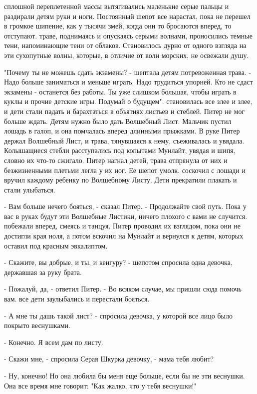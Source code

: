 сплошной переплетенной массы вытягивались маленькие серые пальцы и 
раздирали детям руки и ноги. Постоянный шепот все нарастал, пока не 
перешел в громкое шипение, как у тысячи змей, когда они то бросаются 
вперед, то отступают.
 траве, поднимаясь и опускаясь серыми волнами, проносились 
темные тени, напоминающие тени от облаков. Становилось дурно от одного 
взгляда на эти сухопутные волны, которые, в отличие от волн морских, 
не освежали душу.
\par"Почему ты не можешь сдать экзамены? - шептала детям потревоженная 
трава. - Надо больше заниматься и меньше играть. Надо трудиться 
упорней. Кто не сдаст экзамены - останется без работы. Ты уже слишком 
большая, чтобы играть в куклы и прочие детские игры. Подумай о 
будущем".
 становилась все злее и злее, и дети стали падать и 
барахтаться в объятиях листьев и стеблей. Питер не мог больше ждать. 
Детям нужно было дать Волшебный Лист. Мальчик пустил лошадь в галоп, и 
она помчалась вперед длинными прыжками. В руке Питер держал Волшебный 
Лист, и трава, тянувшаяся к нему, съеживалась и увядала. Колышащиеся 
стебли расступались под копытами Мунлайт, увядая и шипя, словно их 
что-то сжигало.
 Питер нагнал детей, трава отпрянула от них и безжизненными 
плетьми легла у их ног. Ее шепот умолк.
 соскочил с лошади и вручил каждому ребенку по Волшебному 
Листу. Дети прекратили плакать и стали улыбаться.
\par- Вам больше нечего бояться, - сказал Питер. - Продолжайте свой 
путь. Пока у вас в руках будут эти Волшебные Листики, ничего плохого с 
вами не случится.
 побежали вперед, смеясь и танцуя. Питер проводил их взглядом, 
пока они не достигли края ноля, а потом вскочил на Мунлайт и вернулся 
к детям, которых оставил под красным эвкалиптом.
\par- Скажите, вы добрые, и ты, и кенгуру? - шепотом спросила одна 
девочка, державшая за руку брата.
\par- Пожалуй, да, - ответил Питер. - Во всяком случае, мы пришли сюда 
помочь вам.
 все дети заулыбались и перестали бояться.
\par- А мне ты дашь такой лист? - спросила девочка, у которой все лицо 
было покрыто веснушками.
\par- Конечно. Я всем дам по листу.
\par- Скажи мне, - спросила Серая Шкурка девочку, - мама тебя любит?
\par- Ну, конечно! Но она любила бы меня еще больше, если бы не эти 
веснушки. Она все время мне говорит: "Как жалко, что у тебя веснушки!"
